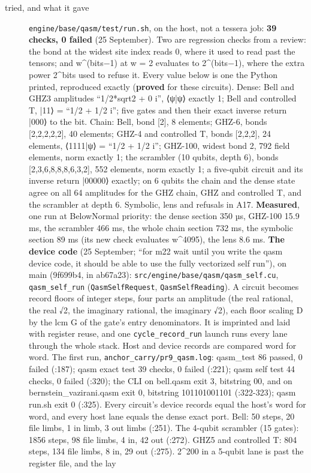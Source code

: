 \begin{description}
\item[{tried, and what it gave}] \texttt{engine/\allowbreak{}base/\allowbreak{}qasm/\allowbreak{}test/\allowbreak{}run.\allowbreak{}sh}, on the host, not a tessera job: \textbf{39 checks, 0 failed} (25 September). Two are regression checks from a review: the bond at the widest site index reads 0, where it used to read past the tensors; and w\textasciicircum{}(bits−1) at w = 2 evaluates to 2\textasciicircum{}(bits−1), where the extra power 2\textasciicircum{}bits used to refuse it. Every value below is one the Python printed, reproduced exactly (\textbf{proved} for these circuits). Dense: Bell and GHZ3 amplitudes “1/2*sqrt2 + 0 i”, ⟨ψ|ψ⟩ exactly 1; Bell and controlled T, |11⟩ = “1/2 + 1/2 i”; five gates and then their exact inverse return |000⟩ to the bit. Chain: Bell, bond [2], 8 elements; GHZ-6, bonds [2,2,2,2,2], 40 elements; GHZ-4 and controlled T, bonds [2,2,2], 24 elements, ⟨1111|ψ⟩ = “1/2 + 1/2 i”; GHZ-100, widest bond 2, 792 field elements, norm exactly 1; the scrambler (10 qubits, depth 6), bonds [2,3,6,8,8,8,6,3,2], 552 elements, norm exactly 1; a five-qubit circuit and its inverse return |00000⟩ exactly; on 6 qubits the chain and the dense state agree on all 64 amplitudes for the GHZ chain, GHZ and controlled T, and the scrambler at depth 6. Symbolic, lens and refusals in A17. \textbf{Measured}, one run at BelowNormal priority: the dense section 350 µs, GHZ-100 15.9 ms, the scrambler 466 ms, the whole chain section 732 ms, the symbolic section 89 ms (its new check evaluates w\textasciicircum{}4095), the lens 8.6 ms. \textbf{The device code} (25 September; “for m22 wait until you write the qasm device code, it should be able to use the fully vectorized self run”), on main (9f699b4, in ab67a23): \texttt{src/\allowbreak{}engine/\allowbreak{}base/\allowbreak{}qasm/\allowbreak{}qasm\_\allowbreak{}self.\allowbreak{}cu}, \texttt{qasm\_\allowbreak{}self\_\allowbreak{}run} (\texttt{Qasm\allowbreak{}Self\allowbreak{}Request}, \texttt{Qasm\allowbreak{}Self\allowbreak{}Reading}). A circuit becomes record floors of integer steps, four parts an amplitude (the real rational, the real √2, the imaginary rational, the imaginary √2), each floor scaling D by the lcm G of the gate's entry denominators. It is imprinted and laid with register reuse, and one \texttt{cycle\_\allowbreak{}record\_\allowbreak{}run} launch runs every lane through the whole stack. Host and device records are compared word for word. The first run, \texttt{anchor\_\allowbreak{}carry/\allowbreak{}pr9\_\allowbreak{}qasm.\allowbreak{}log}: qasm\_\allowbreak{}test 86 passed, 0 failed (:187); qasm exact test 39 checks, 0 failed (:221); qasm self test 44 checks, 0 failed (:320); the CLI on bell.qasm exit 3, bitstring 00, and on bernstein\_\allowbreak{}vazirani.qasm exit 0, bitstring 101101001101 (:322-323); qasm run.sh exit 0 (:325). Every circuit's device records equal the host's word for word, and every host lane equals the dense exact port. Bell: 50 steps, 20 file limbs, 1 in limb, 3 out limbs (:251). The 4-qubit scrambler (15 gates): 1856 steps, 98 file limbs, 4 in, 42 out (:272). GHZ5 and controlled T: 804 steps, 134 file limbs, 8 in, 29 out (:275). 2\textasciicircum{}200 in a 5-qubit lane is past the register file, and the lay 
\end{description}
